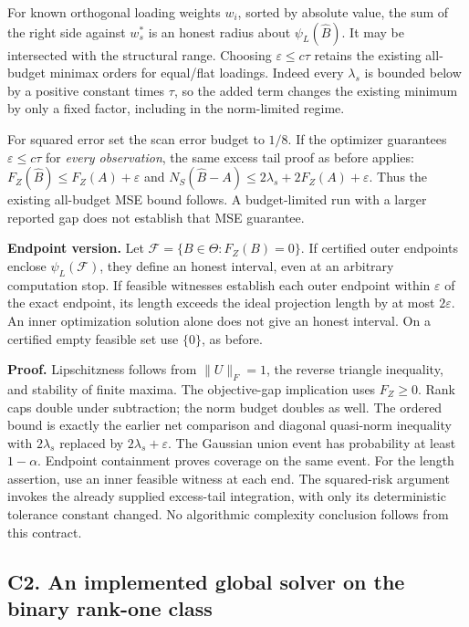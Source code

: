 For known orthogonal loading weights \(w_i\), sorted by absolute value,
the sum of the right side against \(w_s^*\) is an honest radius about
\(\psi_L(\widehat B)\). It may be intersected with the structural range.
Choosing \(\varepsilon\le c\tau\) retains the existing all-budget
minimax orders for equal/flat loadings. Indeed every \(\lambda_s\) is
bounded below by a positive constant times \(\tau\), so the added term
changes the existing minimum by only a fixed factor, including in the
norm-limited regime.

For squared error set the scan error budget to \(1/8\). If the optimizer
guarantees \(\varepsilon\le c\tau\) for \emph{every observation}, the
same excess tail proof as before applies:
\(F_Z(\widehat B)\le F_Z(A)+\varepsilon\) and
\(N_S(\widehat B-A)\le2\lambda_s+2F_Z(A)+\varepsilon\). Thus the
existing all-budget MSE bound follows. A budget-limited run with a
larger reported gap does not establish that MSE guarantee.

\textbf{Endpoint version.} Let \(\mathcal F=\{B\in\Theta:F_Z(B)=0\}\).
If certified outer endpoints enclose \(\psi_L(\mathcal F)\), they define
an honest interval, even at an arbitrary computation stop. If feasible
witnesses establish each outer endpoint within \(\varepsilon\) of the
exact endpoint, its length exceeds the ideal projection length by at
most \(2\varepsilon\). An inner optimization solution alone does not
give an honest interval. On a certified empty feasible set use
\(\{0\}\), as before.

\textbf{Proof.} Lipschitzness follows from \(\|U\|_F=1\), the reverse
triangle inequality, and stability of finite maxima. The objective-gap
implication uses \(F_Z\ge0\). Rank caps double under subtraction; the
norm budget doubles as well. The ordered bound is exactly the earlier
net comparison and diagonal quasi-norm inequality with \(2\lambda_s\)
replaced by \(2\lambda_s+\varepsilon\). The Gaussian union event has
probability at least \(1-\alpha\). Endpoint containment proves coverage
on the same event. For the length assertion, use an inner feasible
witness at each end. The squared-risk argument invokes the already
supplied excess-tail integration, with only its deterministic tolerance
constant changed. No algorithmic complexity conclusion follows from this
contract.

\subsection{C2. An implemented global solver on the binary rank-one
class}\label{c2.-an-implemented-global-solver-on-the-binary-rank-one-class}\label{sup:C2}

